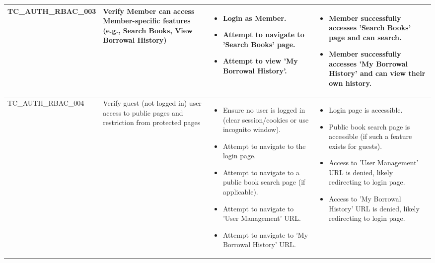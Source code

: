 \documentclass[10pt, a4paper]{report}
\begin{document}
\begin{longtable}{|>{\raggedright\arraybackslash}p{4cm}|>{\raggedright\arraybackslash}p{4cm}|>{\raggedright\arraybackslash}p{5cm}|>{\raggedright\arraybackslash}p{5cm}|}
TC\_AUTH\_RBAC\_003 & Verify Member can access Member-specific features (e.g., Search Books, View Borrowal History) & 
    \begin{itemize}[noitemsep, topsep=0pt, partopsep=0pt, leftmargin=*]
        \item Login as Member.
        \item Attempt to navigate to 'Search Books' page.
        \item Attempt to view 'My Borrowal History'.
    \end{itemize} & 
    \begin{itemize}[noitemsep, topsep=0pt, partopsep=0pt, leftmargin=*]
        \item Member successfully accesses 'Search Books' page and can search.
        \item Member successfully accesses 'My Borrowal History' and can view their own history.
    \end{itemize} \\ \hline
TC\_AUTH\_RBAC\_004 & Verify guest (not logged in) user access to public pages and restriction from protected pages & 
    \begin{itemize}[noitemsep, topsep=0pt, partopsep=0pt, leftmargin=*]
        \item Ensure no user is logged in (clear session/cookies or use incognito window).
        \item Attempt to navigate to the login page.
        \item Attempt to navigate to a public book search page (if applicable).
        \item Attempt to navigate to 'User Management' URL.
        \item Attempt to navigate to 'My Borrowal History' URL.
    \end{itemize} & 
    \begin{itemize}[noitemsep, topsep=0pt, partopsep=0pt, leftmargin=*]
        \item Login page is accessible.
        \item Public book search page is accessible (if such a feature exists for guests).
        \item Access to 'User Management' URL is denied, likely redirecting to login page.
        \item Access to 'My Borrowal History' URL is denied, likely redirecting to login page.
    \end{itemize} \\ \hline

\end{longtable}
\end{document}
